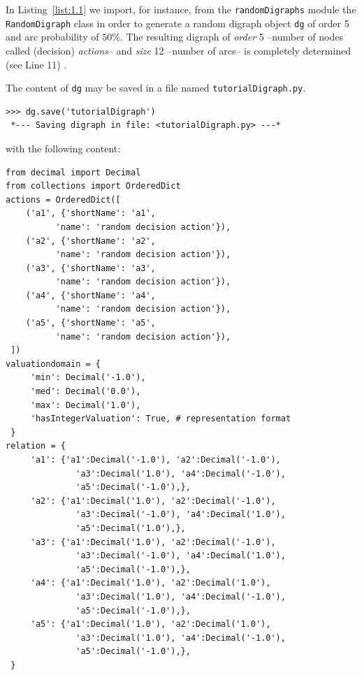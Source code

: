 In Listing~\vref{list:1.1}  we import, for instance, from the \texttt{randomDigraphs} module the \texttt{RandomDigraph} class  in order to generate a random digraph object \texttt{dg} of order 5 and arc probability of $50\%$. The resulting digraph of \emph{order} 5 --number of nodes called (decision) \emph{actions}-- and \emph{size} 12 --number of arcs-- is completely determined (see Line 11) .

The content of \texttt{dg} may be saved in a file named \texttt{tutorialDigraph.py}.
\begin{lstlisting}
>>> dg.save('tutorialDigraph')
 *--- Saving digraph in file: <tutorialDigraph.py> ---*
\end{lstlisting}
with the following content:
\begin{lstlisting}[caption={A stored digraph instance},label=list:1.2]
from decimal import Decimal
from collections import OrderedDict
actions = OrderedDict([
    ('a1', {'shortName': 'a1',
          'name': 'random decision action'}),
    ('a2', {'shortName': 'a2',
          'name': 'random decision action'}),
    ('a3', {'shortName': 'a3',
          'name': 'random decision action'}),
    ('a4', {'shortName': 'a4',
          'name': 'random decision action'}),
    ('a5', {'shortName': 'a5',
          'name': 'random decision action'}),
 ])
valuationdomain = {
     'min': Decimal('-1.0'),
     'med': Decimal('0.0'),
     'max': Decimal('1.0'),
     'hasIntegerValuation': True, # representation format
 }
relation = {
     'a1': {'a1':Decimal('-1.0'), 'a2':Decimal('-1.0'),
              'a3':Decimal('1.0'), 'a4':Decimal('-1.0'),
              'a5':Decimal('-1.0'),},
     'a2': {'a1':Decimal('1.0'), 'a2':Decimal('-1.0'),
              'a3':Decimal('-1.0'), 'a4':Decimal('1.0'),
              'a5':Decimal('1.0'),},
     'a3': {'a1':Decimal('1.0'), 'a2':Decimal('-1.0'),
              'a3':Decimal('-1.0'), 'a4':Decimal('1.0'),
              'a5':Decimal('-1.0'),},
     'a4': {'a1':Decimal('1.0'), 'a2':Decimal('1.0'),
              'a3':Decimal('1.0'), 'a4':Decimal('-1.0'),
              'a5':Decimal('-1.0'),},
     'a5': {'a1':Decimal('1.0'), 'a2':Decimal('1.0'),
              'a3':Decimal('1.0'), 'a4':Decimal('-1.0'),
              'a5':Decimal('-1.0'),},
 }
\end{lstlisting}

